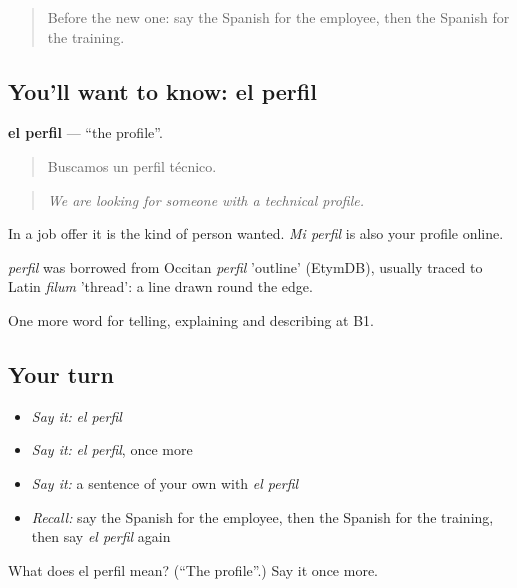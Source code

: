 \label{lesson:ES-C590-perfil}



\begin{quote}
Before the new one: say the Spanish for the employee, then the Spanish for the training.
\end{quote}

\subsection*{You'll want to know: el perfil}
\textbf{el perfil} — \textquotedblleft{}the profile\textquotedblright{}.

\begin{quote}
Buscamos un perfil técnico.
\end{quote}

\begin{quote}
\emph{We are looking for someone with a technical profile.}
\end{quote}

In a job offer it is the kind of person wanted. \emph{Mi perfil} is also your profile online.

\begin{cousinweb}
\emph{perfil} was borrowed from Occitan \emph{perfil} 'outline' (EtymDB), usually traced to Latin \emph{filum} 'thread': a line drawn round the edge.
\end{cousinweb}

\begin{grammarlens}[title={What you've built}]
One more word for telling, explaining and describing at B1.
\end{grammarlens}

\subsection*{Your turn}
\begin{itemize}
\raggedright
  \item \emph{Say it:} \emph{el perfil}
  \item \emph{Say it:} \emph{el perfil}, once more
  \item \emph{Say it:} a sentence of your own with \emph{el perfil}
  \item \emph{Recall:} say the Spanish for the employee, then the Spanish for the training, then say \emph{el perfil} again
\end{itemize}

\begin{tcolorbox}[breakable,colback=teal!4,colframe=teal!35!black,title={Before you move on}]
What does el perfil mean? (\textquotedblleft{}The profile\textquotedblright{}.) Say it once more.
\end{tcolorbox}
